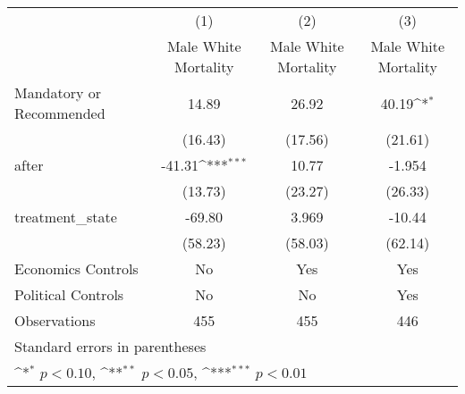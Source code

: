 {
\def\sym#1{\ifmmode^{#1}\else\(^{#1}\)\fi}
\begin{longtable}{l*{3}{c}}
\hline\hline\endfirsthead\hline\endhead\hline\endfoot\endlastfoot
                    &\multicolumn{1}{c}{(1)}&\multicolumn{1}{c}{(2)}&\multicolumn{1}{c}{(3)}\\
                    &\multicolumn{1}{c}{Male White Mortality}&\multicolumn{1}{c}{Male White Mortality}&\multicolumn{1}{c}{Male White Mortality}\\
\hline
Mandatory or Recommended&       14.89         &       26.92         &       40.19\sym{*}  \\
                    &     (16.43)         &     (17.56)         &     (21.61)         \\
[1em]
after               &      -41.31\sym{***}&       10.77         &      -1.954         \\
                    &     (13.73)         &     (23.27)         &     (26.33)         \\
[1em]
treatment\_state     &      -69.80         &       3.969         &      -10.44         \\
                    &     (58.23)         &     (58.03)         &     (62.14)         \\
[1em]
Economics Controls  &          No         &         Yes         &         Yes         \\
[1em]
Political Controls  &          No         &          No         &         Yes         \\
\hline
Observations        &         455         &         455         &         446         \\
\hline\hline
\multicolumn{4}{l}{\footnotesize Standard errors in parentheses}\\
\multicolumn{4}{l}{\footnotesize \sym{*} \(p<0.10\), \sym{**} \(p<0.05\), \sym{***} \(p<0.01\)}\\
\end{longtable}
}
